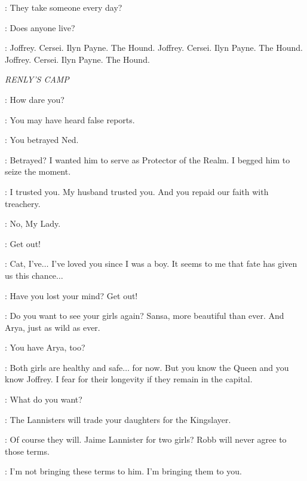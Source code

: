 \GENDRY: They take someone every day? 

\ARYA: Does anyone live? 



\ARYA: Joffrey. Cersei. Ilyn Payne. The Hound. Joffrey. Cersei. Ilyn Payne. The Hound. Joffrey. Cersei. Ilyn Payne. The Hound. 


\scene

\textit{RENLY'S CAMP} 


\CATELYN: How dare you? 

\LITTLEFINGER: You may have heard false reports. 

\CATELYN: You betrayed Ned. 

\LITTLEFINGER: Betrayed? I wanted him to serve as Protector of the Realm. I begged him to seize the moment. 

\CATELYN: I trusted you. My husband trusted you. And you repaid our faith with treachery. 

\LITTLEFINGER: No, My Lady. 

\CATELYN: Get out! 

\LITTLEFINGER: Cat, I've$\ldots$ I've loved you since I was a boy. It seems to me that fate has given us this chance$\ldots$  

\CATELYN: Have you lost your mind? Get out! 


\LITTLEFINGER: Do you want to see your girls again? Sansa, more beautiful than ever. And Arya, just as wild as ever. 

\CATELYN: You have Arya, too? 

\LITTLEFINGER: Both girls are healthy and safe$\ldots$ for now. But you know the Queen and you know Joffrey. I fear for their longevity if they remain in the capital. 


\CATELYN: What do you want? 

\LITTLEFINGER: The Lannisters will trade your daughters for the Kingslayer. 

\CATELYN: Of course they will. Jaime Lannister for two girls? Robb will never agree to those terms. 

\LITTLEFINGER: I'm not bringing these terms to him. I'm bringing them to you. 


